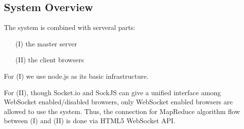 \subsection{System Overview}

The system is combined with serveral parts:

\begin{enumerate}

\item[(I)] the master server

\item[(II)] the client browsers


\end{enumerate}

For (I) we use node.js as its basic infrastructure.

For (II), though Socket.io and SockJS can give a unified interface among WebSocket enabled/disabled browsers, only WebSocket enabled browsers are allowed to use the system.
Thus, the connection for MapReduce algorithm flow between (I) and (II) is done via HTML5 WebSocket API.
